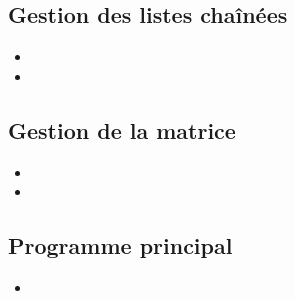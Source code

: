 \subsection{Gestion des listes chaînées}
  \begin{itemize}
    \item {}
    \item {}
  \end{itemize}

\subsection{Gestion de la matrice}
  \begin{itemize}
    \item {}
    \item {}
  \end{itemize}
  
\subsection{Programme principal}
  \begin{itemize}
    \item {}
  \end{itemize}
